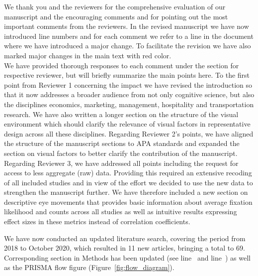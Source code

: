 We thank you and the reviewers for the comprehensive evaluation of our manuscript and the encouraging comments and for pointing out the most important comments from the reviewers. In the revised manuscript we have now introduced line numbers and for each comment we refer to a line in the document where we have introduced a major change. To facilitate the revision we have also marked major changes in the main text with red color. \\

We have provided thorough responses to each comment under the section for respective reviewer, but will briefly summarize the main points here. To the first point from Reviewer 1 concerning the impact we have revised the introduction so that it now addresses a broader audience from not only cognitive science, but also the disciplines economics, marketing, management, hospitality and transportation research. We have also written a longer section on the structure of the visual environment which should clarify the relevance of visual factors in representative design across all these disciplines. Regarding Reviewer 2's points, we have aligned the structure of the manuscript sections to APA standards and expanded the section on visual factors to better clarify the contribution of the manuscript. Regarding Reviewer 3, we have addressed all points including the request for access to less aggregate (raw) data. Providing this required an extensive recoding of all included studies and in view of the effort we decided to use the new data to strengthen the manuscript further. We have therefore included a new section on descriptive eye movements that provides basic information about average fixation likelihood and counts across all studies as well as intuitive results expressing effect sizes in these metrics instead of correlation coefficients.    

    
We have now conducted an updated literature search, covering the period from 2018 to October 2020, which resulted in 11 new articles, bringing a total to 69. Corresponding section in Methods has been updated (see line~ and line~) as well as the PRISMA flow figure (Figure~\ref{fig:flow_diagram}).
    
    

